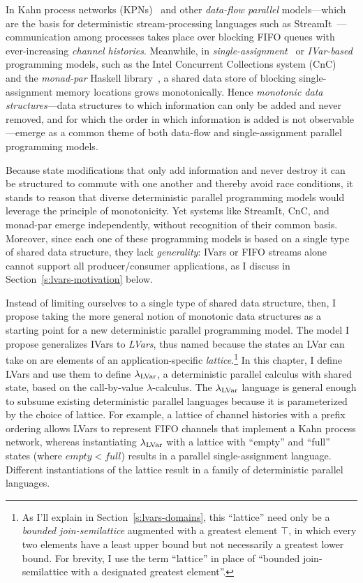 In Kahn process networks (KPNs)~\cite{Kahn-1974} and other
\emph{data-flow parallel} models---which are the basis for
deterministic stream-processing languages such as
StreamIt~\cite{streamit-asplos}---communication among processes takes
place over blocking FIFO queues with ever-increasing \emph{channel
  histories}.  Meanwhile, in
\emph{single-assignment}~\cite{Tesler-1968} or
\emph{IVar-based}~\cite{IStructures} programming models, such as the
Intel Concurrent Collections system (CnC)~\cite{CnC} and the
\emph{monad-par} Haskell library~\cite{monad-par}, a shared data store
of blocking single-assignment memory locations grows monotonically.
Hence \emph{monotonic data structures}---data structures to which
information can only be added and never removed, and for which the
order in which information is added is not observable---emerge as a
common theme of both data-flow and single-assignment parallel
programming models.

Because state modifications that only add information and never
destroy it can be structured to commute with one another and thereby
avoid race conditions, it stands to reason that diverse deterministic
parallel programming models would leverage the principle of
monotonicity.  Yet systems like StreamIt, CnC, and monad-par emerge
independently, without recognition of their common basis.  Moreover,
since each one of these programming models is based on a single type
of shared data structure, they lack \emph{generality}: IVars or FIFO
streams alone cannot support all producer/consumer applications, as I
discuss in Section~\ref{s:lvars-motivation} below.

Instead of limiting ourselves to a single type of shared data
structure, then, I propose taking the more general notion of monotonic
data structures as a starting point for a new deterministic parallel
programming model.  The model I propose generalizes IVars
to \emph{LVars}, thus named because the states an LVar can take on are
elements of an application-specific \emph{lattice}.\footnote{As I'll
explain in Section~\ref{s:lvars-domains}, this ``lattice'' need only
be a \emph{bounded join-semilattice} augmented with a greatest element
$\top$, in which every two elements have a least upper bound but not
necessarily a greatest lower bound.  For brevity, I use the term
``lattice'' in place of ``bounded join-semilattice with a designated
greatest element''.}  In this chapter, I define LVars and use them to
define $\lambda_{\textrm{LVar}}$, a deterministic parallel calculus with shared
state, based on the call-by-value $\lambda$-calculus.  The
$\lambda_{\textrm{LVar}}$ language is general enough to subsume existing
deterministic parallel languages because it is parameterized by the
choice of lattice.  For example, a lattice of channel histories with a
prefix ordering allows LVars to represent FIFO channels that implement
a Kahn process network, whereas instantiating $\lambda_{\textrm{LVar}}$ with a
lattice with ``empty'' and ``full'' states (where $\mathit{empty} <
\mathit{full}$) results in a parallel single-assignment language.
Different instantiations of the lattice result in a family of
deterministic parallel languages.

